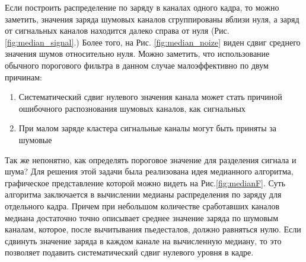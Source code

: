 Если построить распределение по заряду в каналах одного кадра, то можно заметить, значения заряда шумовых каналов  сгруппированы вблизи нуля, а заряд от сигнальных каналов находится далеко справа от нуля (Рис. \ref{fig:median_signal}.) Более того, на Рис. \ref{fig:median_noize} виден сдвиг среднего значения шумов относительно нуля. Можно заметить, что использование обычного порогового фильтра в данном случае малоэффективно по двум причинам:
\begin{enumerate}
	\item Систематический сдвиг нулевого значения канала может стать причиной ошибочного распознования шумовых каналов, как сигнальных
	\item При малом заряде кластера сигнальные каналы могут быть приняты за шумовые
\end{enumerate}
Так же непонятно, как определять пороговое значение для разделения сигнала и шума? Для решения этой задачи была реализована идея медианного алгоритма, графическое представление которой можно видеть на Рис.\ref{fig:medianF}. Суть алгоритма заключается в вычислении медианы распределения по заряду для отдельного кадра. Причем при небольшом количестве сработавших каналов медиана достаточно точно описывает среднее значение заряда по шумовым каналам, которое, после вычитывания пьедесталов, должно равняться нулю. Если сдвинуть значение заряда в каждом канале на вычисленную медиану, то это позволяет подавить систематический сдвиг нулевого уровня в кадре. 
